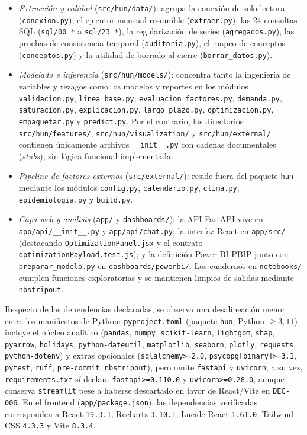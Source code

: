 \begin{itemize}[leftmargin=*,nosep]
\item \textit{Extracción y calidad} (\texttt{src/hun/data/}): agrupa la conexión de solo lectura (\texttt{conexion.py}), el ejecutor mensual resumible (\texttt{extraer.py}), las 24 consultas SQL (\texttt{sql/00\_*} a \texttt{sql/23\_*}), la regularización de series (\texttt{agregados.py}), las pruebas de consistencia temporal (\texttt{auditoria.py}), el mapeo de conceptos (\texttt{conceptos.py}) y la utilidad de borrado al cierre (\texttt{borrar\_datos.py}).
\item \textit{Modelado e inferencia} (\texttt{src/hun/models/}): concentra tanto la ingeniería de variables y rezagos como los modelos y reportes en los módulos \texttt{validacion.py}, \texttt{linea\_base.py}, \texttt{evaluacion\_}\allowbreak\texttt{factores.py}, \texttt{demanda.py}, \texttt{saturacion.py}, \texttt{explicacion.py}, \texttt{largo\_plazo.py}, \texttt{optimizacion.py}, \texttt{empaquetar.py} y \texttt{predict.py}. Por el contrario, los directorios \texttt{src/hun/features/}, \texttt{src/hun/visualization/} y \texttt{src/hun/external/} contienen únicamente archivos \texttt{\_\_init\_\_.py} con cadenas documentales (\textit{stubs}), sin lógica funcional implementada.
\item \textit{Pipeline de factores externos} (\texttt{src/external/}): reside fuera del paquete \texttt{hun} mediante los módulos \texttt{config.py}, \texttt{calendario.py}, \texttt{clima.py}, \texttt{epidemiologia.py} y \texttt{build.py}.
\item \textit{Capa web y análisis} (\texttt{app/} y \texttt{dashboards/}): la API FastAPI vive en \texttt{app/api/\_\_init\_\_.py} y \texttt{app/api/chat.py}; la interfaz React en \texttt{app/src/} (destacando \texttt{OptimizationPanel.jsx} y el contrato \texttt{optimizationPayload.test.js}); y la definición Power BI PBIP junto con \texttt{preparar\_modelo.py} en \texttt{dashboards/powerbi/}. Los cuadernos en \texttt{notebooks/} cumplen funciones exploratorias y se mantienen limpios de salidas mediante \texttt{nbstripout}.
\end{itemize}

Respecto de las dependencias declaradas, se observa una desalineación menor entre los manifiestos de Python: \texttt{pyproject.toml} (paquete \texttt{hun}, Python $\ge 3{,}11$) incluye el núcleo analítico (\texttt{pandas}, \texttt{numpy}, \texttt{scikit-learn}, \texttt{lightgbm}, \texttt{shap}, \texttt{pyarrow}, \texttt{holidays}, \texttt{python-dateutil}, \texttt{matplotlib}, \texttt{seaborn}, \texttt{plotly}, \texttt{requests}, \texttt{python-dotenv}) y extras opcionales (\texttt{sqlalchemy>=2.0}, \texttt{psycopg[binary]>=3.1}, \texttt{pytest}, \texttt{ruff}, \texttt{pre-commit}, \texttt{nbstripout}), pero omite \texttt{fastapi} y \texttt{uvicorn}; a su vez, \texttt{requirements.txt} sí declara \texttt{fastapi>=0.110.0} y \texttt{uvicorn>=0.28.0}, aunque conserva \texttt{streamlit} pese a haberse descartado en favor de React/Vite en \texttt{DEC-006}. En el frontend (\texttt{app/package.json}), las dependencias verificadas corresponden a React \texttt{19.3.1}, Recharts \texttt{3.10.1}, Lucide React \texttt{1.61.0}, Tailwind CSS \texttt{4.3.3} y Vite \texttt{8.3.4}.


